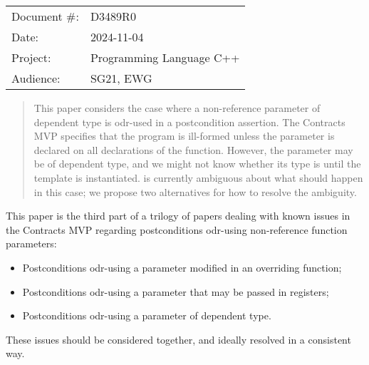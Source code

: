 \begin{tabular}{ll}
Document \#: & D3489R0 \\
Date: &2024-11-04 \\
Project: & Programming Language C++ \\
Audience: & SG21, EWG
\end{tabular}

\begin{abstract}
This paper considers the case where a non-reference parameter of dependent type is odr-used in a postcondition assertion. The Contracts MVP \cite{P2900R10} specifies that the program is ill-formed unless the parameter is declared  on all declarations of the function. However, the parameter may be of dependent type, and we might not know whether its type is  until the template is instantiated. \cite{P2900R10} is currently ambiguous about what should happen in this case; we propose two alternatives for how to resolve the ambiguity.
\end{abstract}







This paper is the third part of a trilogy of papers dealing with known issues in the Contracts MVP \cite{P2900R10} regarding postconditions odr-using non-reference function parameters:
\begin{itemize}
\item \cite{D3484R1} Postconditions odr-using a parameter modified in an overriding function;
\item \cite{D3487R0} Postconditions odr-using a parameter that may be passed in registers;
\item \cite{D3489R0} Postconditions odr-using a parameter of dependent type.
\end{itemize}
These issues should be considered together, and ideally resolved in a consistent way.

